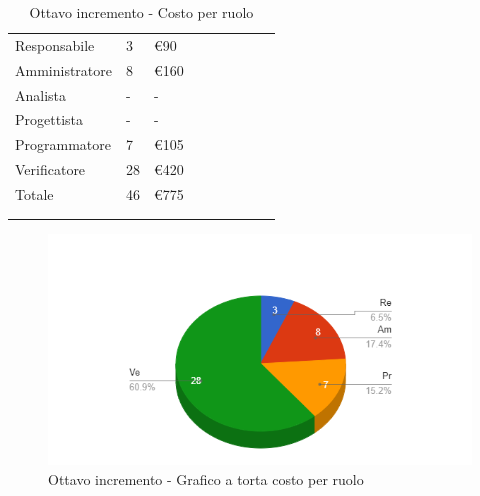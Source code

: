 {{\begin{longtable}{C{.4\freewidth} C{.2\freewidth} C{.2\freewidth} C{.2\freewidth} C{.2\freewidth} C{.2\freewidth} C{.2\freewidth} C{.2\freewidth} C{.2\freewidth}}
        Responsabile  & 3 & €90\\
        Amministratore  & 8 & €160 \\
        Analista &- & -\\
        Progettista &- &-\\
        Programmatore &7 & €105\\
        Verificatore &28 &€420\\
        Totale&46&€775\\
        \bottomrule
      \\
        \caption{Ottavo incremento - Costo per ruolo}
        \end{longtable}

        \begin{figure}[H]
          \includegraphics[width=15cm]{sezioni/Images/ottavoT.png}
          \centering
          \caption{Ottavo incremento - Grafico a torta costo per ruolo}
       \end{figure}
    }

    }


